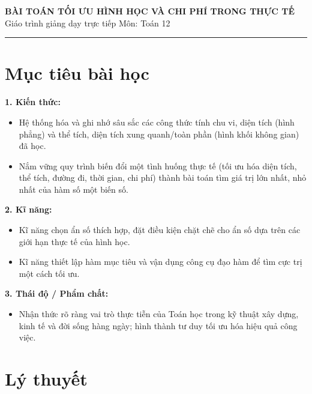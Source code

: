 \documentclass[12pt]{article}
\begin{document}
	
	\begin{center}
		{\LARGE \textbf{BÀI TOÁN TỐI ƯU HÌNH HỌC VÀ CHI PHÍ TRONG THỰC TẾ}}\\[6pt]
		{\large Giáo trình giảng dạy trực tiếp \quad Môn: Toán 12}
	\end{center}
	\vspace{4mm}
	\hrule
	\vspace{4mm}
	
	\section*{Mục tiêu bài học}
	
	\textbf{1. Kiến thức:}
	\begin{itemize}
		\item Hệ thống hóa và ghi nhớ sâu sắc các công thức tính chu vi, diện tích (hình phẳng) và thể tích, diện tích xung quanh/toàn phần (hình khối không gian) đã học.
		\item Nắm vững quy trình biến đổi một tình huống thực tế (tối ưu hóa diện tích, thể tích, đường đi, thời gian, chi phí) thành bài toán tìm giá trị lớn nhất, nhỏ nhất của hàm số một biến số.
	\end{itemize}
	
	\textbf{2. Kĩ năng:}
	\begin{itemize}
		\item Kĩ năng chọn ẩn số thích hợp, đặt điều kiện chặt chẽ cho ẩn số dựa trên các giới hạn thực tế của hình học.
		\item Kĩ năng thiết lập hàm mục tiêu và vận dụng công cụ đạo hàm để tìm cực trị một cách tối ưu.
	\end{itemize}
	
	\textbf{3. Thái độ / Phẩm chất:}
	\begin{itemize}
		\item Nhận thức rõ ràng vai trò thực tiễn của Toán học trong kỹ thuật xây dựng, kinh tế và đời sống hàng ngày; hình thành tư duy tối ưu hóa hiệu quả công việc.
	\end{itemize}
	
	\newpage
	
	\setcounter{tocdepth}{2}
	\tableofcontents
	\newpage
	
	\section{Lý thuyết}
	
\end{document}
